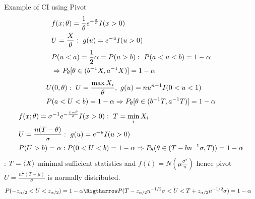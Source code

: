 \documentclass[asd-beamer.tex]{subfiles}
\begin{document}
\begin{frame}[allowframebreaks]{Example of CI using Pivot}
\begin{align*}
&f(x;\theta)=\frac{1}{\theta}e^{-\frac{x}{\theta}}I(x>0)\\
&U=\frac{X}{\theta}:\ g(u)=e^{-u}I(u>0)\\
&P(u<a)=\frac{1}{2}\alpha=P(u>b):\ P(a<u<b)=1-\alpha\\
&\Rightarrow P_{\theta}[\theta\in({b}^{-1}X,{a}^{-1}X)]=1-\alpha
\end{align*}
\begin{align*}
&U(0,\theta):\ U=\frac{\max X_i}{\theta},\ g(u)=nu^{n-1}I(0<u<1)\\
&P(a<U<b)=1-\alpha\Rightarrow P_{\theta}[\theta\in(\invers{b}T,\invers{a}T)]=1-\alpha
\end{align*}
\begin{align*}
&f(x;\theta)=\invers{\sigma}\exp{-\frac{x-\theta}{\sigma}}I(x>0):\ T=\min_iX_i\\
&U=\frac{n(T-\theta)}{\sigma}:\ g(u)=\exp{-u}I(u>0)\\
&P(U>b)=\alpha: P(0<U<b)=1-\alpha\Rightarrow P_{\theta}(\theta\in(T-b\invers{n}\sigma,T))=1-\alpha
\end{align*}
: $T=\langle X \rangle$ minimal sufficient statistics and $f(t)=N(\mu\frac{\sigma^2}{n})$ hence pivot $U=\frac{n^{\frac{1}{2}}(T-\mu)}{\sigma}$ is normally distributed.
\begin{align*}
&P(-z_{\alpha/2}<U<z_{\alpha/2})=1-\alpha\Rigtharrow P(T-z_{\alpha/2}n^{-1/2}\sigma<U<T+z_{\alpha/2}n^{-1/2}\sigma)=1-\alpha
&
\end{align*}
\end{frame}
\end{document}
